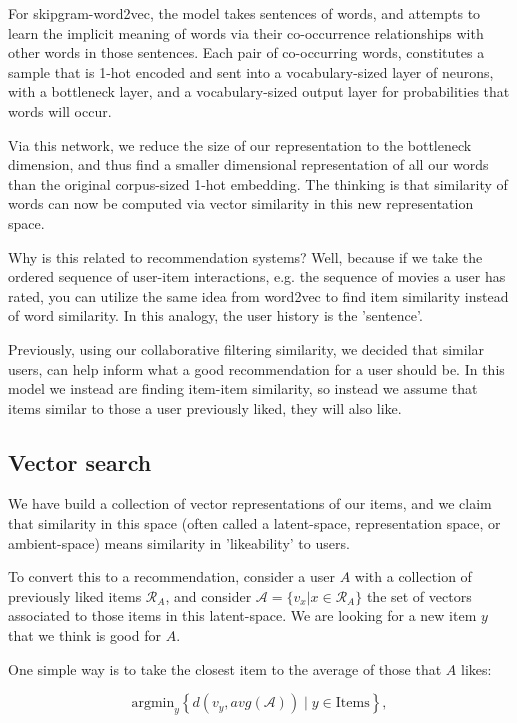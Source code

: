 For skipgram-word2vec, the model takes sentences of words, and attempts to learn the implicit meaning of words via their co-occurrence relationships with other words in those sentences. Each pair of co-occurring words, constitutes a sample that is 1-hot encoded and sent into a vocabulary-sized layer of neurons, with a bottleneck layer, and a vocabulary-sized output layer for probabilities that words will occur.

Via this network, we reduce the size of our representation to the bottleneck dimension, and thus find a smaller dimensional representation of all our words than the original corpus-sized 1-hot embedding. The thinking is that similarity of words can now be computed via vector similarity in this new representation space. 

Why is this related to recommendation systems? Well, because if we take the ordered sequence of user-item interactions, e.g. the sequence of movies a user has rated, you can utilize the same idea from word2vec to find item similarity instead of word similarity. In this analogy, the user history is the 'sentence'.

Previously, using our collaborative filtering similarity, we decided that similar users, can help inform what a good recommendation for a user should be. In this model we instead are finding item-item similarity, so instead we assume that items similar to those a user previously liked, they will also like. 

\subsection{Vector search}

We have build a collection of vector representations of our items, and we claim that similarity in this space (often called a latent-space, representation space, or ambient-space) means similarity in 'likeability' to users.

To convert this to a recommendation, consider a user $A$ with a collection of previously liked items $\mathcal{R}_A$, and consider $\mathcal{A}=\lbrace v_x | x\in \mathcal{R}_A\rbrace$ the set of vectors associated to those items in this latent-space. We are looking for a new item $y$ that we think is good for $A$.

One simple way is to take the closest item to the average of those that $A$ likes:

\begin{equation}
	\textrm{argmin}_y\left\lbrace d(v_y,avg(\mathcal{A}))\mid y\in \textrm{Items}\right\rbrace,
\end{equation}

